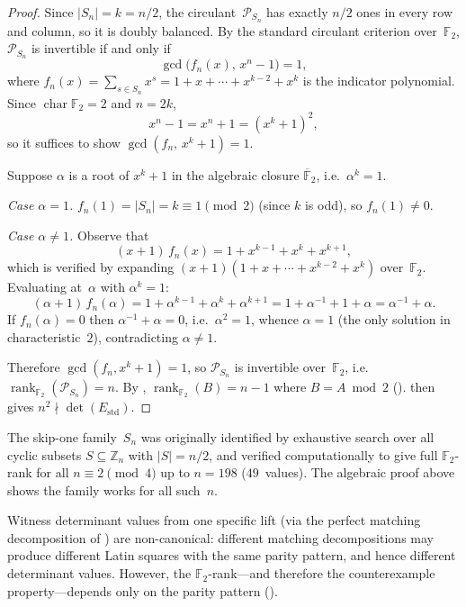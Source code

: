\documentclass[11pt,a4paper]{article}
\newcommand{\ZZ}{\mathbb{Z}}
\newcommand{\FF}{\mathbb{F}}
\newcommand{\rank}{\operatorname{rank}}
\newcommand{\Estd}{E_{\mathrm{std}}}
\begin{document}
\begin{proof}
Since $|S_n|=k=n/2$, the circulant~$\mathcal{P}_{S_n}$ has exactly
$n/2$ ones in every row and column, so it is doubly balanced.
By the standard circulant criterion over~$\FF_2$,
$\mathcal{P}_{S_n}$ is invertible if and only if
\[
  \gcd\bigl(f_n(x),\,x^n-1\bigr)=1,
\]
where $f_n(x)=\sum_{s\in S_n}x^s = 1+x+\cdots+x^{k-2}+x^k$ is the
indicator polynomial.  Since $\operatorname{char}\FF_2=2$ and $n=2k$,
\[
  x^n-1 = x^n+1 = (x^k+1)^2,
\]
so it suffices to show $\gcd(f_n,\,x^k+1)=1$.

Suppose $\alpha$ is a root of $x^k+1$ in the algebraic closure
$\overline{\FF}_2$, i.e.\ $\alpha^k=1$.

\smallskip\noindent
\emph{Case $\alpha=1$.}\;
$f_n(1)=|S_n|=k\equiv 1\pmod{2}$ (since $k$ is odd), so
$f_n(1)\ne 0$.

\smallskip\noindent
\emph{Case $\alpha\ne 1$.}\;
Observe that
\[
  (x+1)\,f_n(x) = 1+ x^{k-1}+x^k+x^{k+1},
\]
which is verified by expanding
$(x+1)(1+x+\cdots+x^{k-2}+x^k)$ over~$\FF_2$.
Evaluating at~$\alpha$ with $\alpha^k=1$:
\[
  (\alpha+1)\,f_n(\alpha)
  = 1+\alpha^{k-1}+\alpha^k+\alpha^{k+1}
  = 1+\alpha^{-1}+1+\alpha
  = \alpha^{-1}+\alpha.
\]
If $f_n(\alpha)=0$ then $\alpha^{-1}+\alpha=0$, i.e.\
$\alpha^2=1$, whence $\alpha=1$ (the only solution in
characteristic~$2$), contradicting $\alpha\ne 1$.

\medskip
Therefore $\gcd(f_n,x^k+1)=1$, so $\mathcal{P}_{S_n}$ is invertible
over~$\FF_2$, i.e.\ $\rank_{\FF_2}(\mathcal{P}_{S_n})=n$.
By ,
$\rank_{\FF_2}(B)=n-1$ where $B=A\bmod 2$ ().
 then gives
$n^2\nmid\det(\Estd)$.
\end{proof}

\begin{remark}\label{rem:skip-one}
The skip-one family~$S_n$ was originally identified by exhaustive search
over all cyclic subsets $S\subseteq\ZZ_n$ with $|S|=n/2$, and verified
computationally to give full $\FF_2$-rank for all
$n\equiv 2\pmod{4}$ up to $n=198$ ($49$~values).
The algebraic proof above shows the family works for all such~$n$.

Witness determinant values from one specific lift (via the perfect
matching decomposition of \Cref{prop:balanced-lift}) are non-canonical:
different matching decompositions may produce different Latin squares
with the same parity pattern, and hence different determinant values.
However, the $\FF_2$-rank---and therefore the counterexample
property---depends only on the parity pattern
().
\end{remark}
\end{document}
